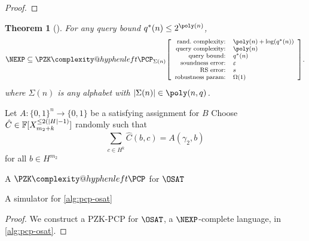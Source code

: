 \documentclass[english,12pt]{reedthesis}
\makeatletter
\theoremstyle{plain}
\newtheorem{thm}{Theorem}[section]
\theoremstyle{definition}
\theoremstyle{remark}
\DeclarePairedDelimiter{\abs}{\lvert}{\rvert}
\newcommand{\pzkpcpr}[6]{%
  \ensuremath%
  \mleft[{\footnotesize\begin{array}{r l}
    \text{rand.\ complexity:} & #1 \\
    \text{query complexity:} & #2 \\
    \text{query bound:} & #3 \\
    \text{soundness error:} & #4 \\
    \text{RS error:} & #5 \\
    \text{robustness param:} & #6
  \end{array}}\mright]%
}
\newcommand{\PZKPCP}{%
  \PZK\complexity@hyphenleft\PCP
}
\makeatother
\begin{document}
\begin{proof}
\end{proof}

\begin{thm}[{\cite[Theorem 6.3]{GOS25}}]\label{thm:nexp-zk-pcp}
  For any query bound $q^{*}(n) \le 2^{\poly(n)}$,
  \[
    \NEXP \subseteq
    \PZKPCP_{\Sigma(n)}\pzkpcpr{\poly(n)+\log(q^{*}(n))}{\poly(n)}{q^{*}(n)}{\varepsilon}{s}{\Omega(1)}.
  \]
  where $\Sigma(n)$ is any alphabet with $\abs{\Sigma(n)} \in \poly(n, q)$.
\end{thm}

\begin{algorithm}[htbp]
  Let $A\colon \{0, 1\}^{n} \rightarrow \{0, 1\}$ be a satisfying assignment for $B$\;
  Choose $\hat{C} \in \mathbb{F}[X_{m_{2} + k}^{\le 2(\abs{H} - 1)}]$ randomly such
  that
  \[
    \sum_{c \in H^{k}}\hat{C}(b, c) = A(\gamma_{2}, b)
  \]
  for all $b \in H^{m_{2}}$\;
  \;
  \caption{A $\PZKPCP$ for $\OSAT$~\cite[Construction 6.4]{GOS25}}\label{alg:pcp-osat}
\end{algorithm}

\begin{algorithm}[htbp]
  \caption{A simulator for \cref{alg:pcp-osat}~\cite[Construction 6.7]{GOS25}}\label{alg:pcp-osat-sim}
\end{algorithm}

\begin{proof}
  We construct a PZK-PCP for $\OSAT$, a $\NEXP$-complete language, in
  \cref{alg:pcp-osat}.
\end{proof}
\end{document}
